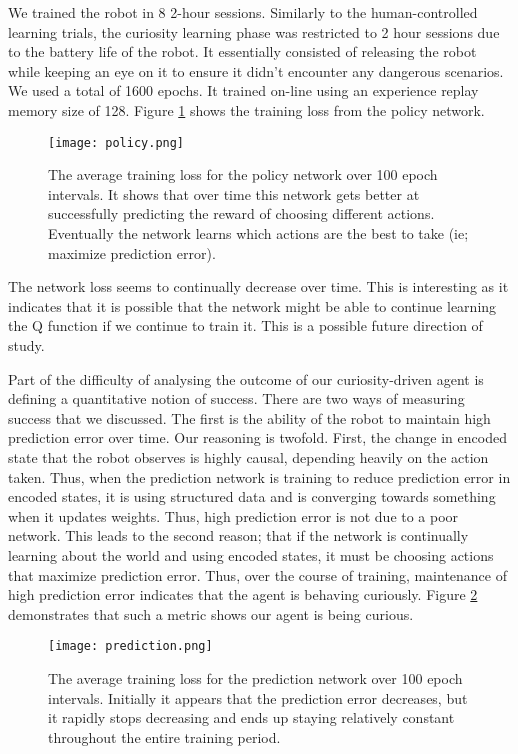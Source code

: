 \documentclass[conference, 12pt]{IEEEtran} %
\begin{document}
	\par We trained the robot in 8 2-hour sessions. Similarly to the human-controlled learning trials, the curiosity learning phase was restricted to 2 hour sessions due to the battery life of the robot. It essentially consisted of releasing the robot while keeping an eye on it to ensure it didn't encounter any dangerous scenarios. We used a total of 1600 epochs. It trained on-line using an experience replay memory size of 128. Figure \ref{fig:policy} shows the training loss from the policy network.
	\begin{figure}[ht]
		\centering
		\texttt{[image: policy.png]}
		\caption{The average training loss for the policy network over 100 epoch intervals. It shows that over time this network gets better at successfully predicting the reward of choosing different actions. Eventually the network learns which actions are the best to take (ie; maximize prediction error).}
		\label{fig:policy}
	\end{figure}
	\par The network loss seems to continually decrease over time. This is interesting as it indicates that it is possible that the network might be able to continue learning the Q function if we continue to train it. This is a possible future direction of study.
	\par Part of the difficulty of analysing the outcome of our curiosity-driven agent is defining a quantitative notion of success. There are two ways of measuring success that we discussed. The first is the ability of the robot to maintain high prediction error over time. Our reasoning is twofold. First, the change in encoded state that the robot observes is highly causal, depending heavily on the action taken. Thus, when the prediction network is training to reduce prediction error in encoded states, it is using structured data and is converging towards something when it updates weights. Thus, high prediction error is not due to a poor network. This leads to the second reason; that if the network is continually learning about the world and using encoded states, it must be choosing actions that maximize prediction error. Thus, over the course of training, maintenance of high prediction error indicates that the agent is behaving curiously. Figure \ref{fig:prediction} demonstrates that such a metric shows our agent is being curious.
	\begin{figure}[ht]
		\centering
		\texttt{[image: prediction.png]}
		\caption{The average training loss for the prediction network over 100 epoch intervals. Initially it appears that the prediction error decreases, but it rapidly stops decreasing and ends up staying relatively constant throughout the entire training period.}
		\label{fig:prediction}
	\end{figure}
\end{document}
